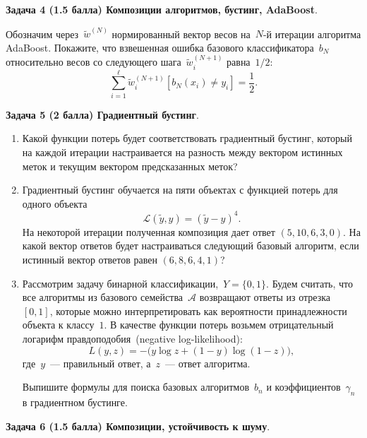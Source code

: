 \documentclass[10pt]{article}
\begin{document}
\bigskip

\textbf{Задача 4 (1.5 балла) Композиции алгоритмов, бустинг, AdaBoost}.

    Обозначим через~$\tilde w^{(N)}$ нормированный вектор весов
    на~$N$-й итерации алгоритма AdaBoost.
    Покажите, что взвешенная ошибка базового классификатора~$b_N$
    относительно весов со следующего шага~$\tilde w_i^{(N + 1)}$
    равна~$1/2$:
    \[
        \sum_{i = 1}^{\ell}
            \tilde w_i^{(N + 1)}
            [b_N(x_i) \neq y_i]
        =
        \frac{1}{2}.
    \]
    
\bigskip


\textbf{Задача 5 (2 балла) Градиентный бустинг}.
    ~

    \begin{enumerate}

        
        \item Какой функции потерь будет соответствовать градиентный бустинг, который на каждой итерации настраивается на разность между вектором истинных меток и текущим вектором предсказанных меток?
        
        \item Градиентный бустинг обучается на пяти объектах с функцией потерь для одного объекта
        \[
            \mathcal{L}(\tilde y, y) = (\tilde y - y)^4.
        \]
        На некоторой итерации полученная композиция дает ответ $(5, 10, 6, 3, 0)$. На какой вектор ответов будет настраиваться следующий базовый алгоритм, если истинный вектор ответов равен $(6, 8, 6, 4, 1)$? 
        
        \item Рассмотрим задачу бинарной классификации,~$Y = \{0, 1\}$.
    Будем считать, что все алгоритмы из базового семейства~$\mathcal{A}$
    возвращают ответы из отрезка~$[0, 1]$, которые можно интерпретировать
    как вероятности принадлежности объекта к классу~$1$.
    В качестве функции потерь возьмем отрицательный
    логарифм правдоподобия~(negative log-likelihood):
    \[
        L(y, z)
        =
        -\bigl(
        y \log z
        +
        (1 - y) \log(1 - z)
        \bigr),
    \]
    где~$y$~--- правильный ответ, а~$z$~--- ответ алгоритма.

    Выпишите формулы для поиска базовых алгоритмов~$b_n$
    и коэффициентов~$\gamma_n$ в градиентном бустинге.
    \end{enumerate}
\bigskip



\bigskip
\textbf{Задача 6 (1.5 балла) Композиции, устойчивость к шуму}.
    ~
\end{document}
